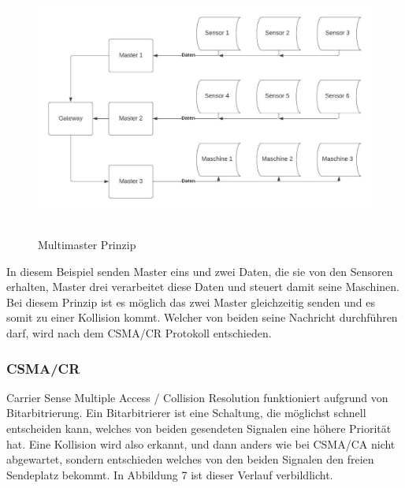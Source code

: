 \begin{figure}[h]
    \begin{center}
        \includegraphics[width=13.98cm, height= 8.48cm]{images/Abbildung 6.jpeg}
        \caption{Multimaster Prinzip}
        \label{MMaster}
        \end{center}
\end{figure}

In diesem Beispiel senden Master eins und zwei Daten, die sie von den Sensoren erhalten, Master drei verarbeitet diese Daten und steuert damit seine Maschinen. Bei diesem Prinzip ist es möglich das zwei Master gleichzeitig senden und es somit zu einer Kollision kommt. Welcher von beiden seine Nachricht durchführen darf, wird nach dem CSMA/CR Protokoll entschieden. 

\clearpage
\subsubsection{CSMA/CR}
Carrier Sense Multiple Access / Collision Resolution funktioniert aufgrund von Bitarbitrierung. Ein Bitarbitrierer ist eine Schaltung, die möglichst schnell entscheiden kann, welches von beiden gesendeten Signalen eine höhere Priorität hat. Eine Kollision wird also erkannt, und dann anders wie bei CSMA/CA nicht abgewartet, sondern entschieden welches von den beiden Signalen den freien Sendeplatz bekommt. In Abbildung 7 ist dieser Verlauf verbildlicht. \\

